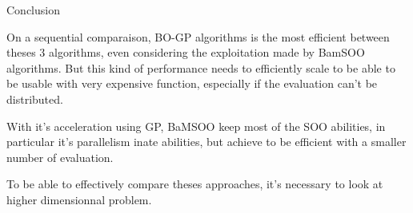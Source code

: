 \begin{frame}{Conclusion}

On a sequential comparaison, BO-GP algorithms is the most efficient between theses 3 algorithms, even considering the exploitation made by BamSOO algorithms. But this kind of performance needs to efficiently scale to be able to be usable with very expensive function, especially if the evaluation can't be distributed. 

With it's acceleration using GP, BaMSOO keep most of the SOO abilities, in particular it's parallelism inate abilities, but achieve to be efficient with a smaller number of evaluation. 

To be able to effectively compare theses approaches, it's necessary to look at higher dimensionnal problem. 

\end{frame}